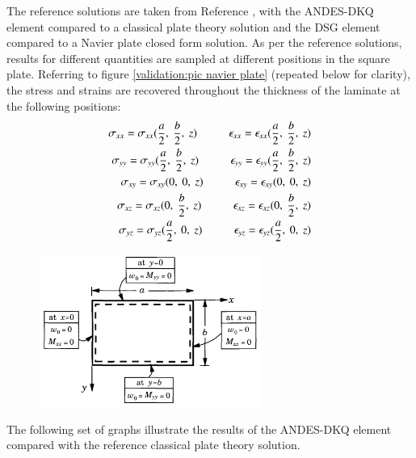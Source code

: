 The reference solutions are taken from Reference \cite{reddy2004mechanics}, with the ANDES-DKQ element compared to a classical plate theory solution and the DSG element compared to a Navier plate closed form solution. As per the reference solutions, results for different quantities are sampled at different positions in the square plate. Referring to figure \ref{validation:pic navier plate} (repeated below for clarity), the stress and strains are recovered throughout the thickness of the laminate at the following positions:
\begin{align*} 
\sigma_{xx} = \sigma_{xx}(\frac{a}{2},\ \frac{b}{2},\ z)
\hspace{10mm}
\epsilon_{xx} = \epsilon_{xx}(\frac{a}{2},\ \frac{b}{2},\ z)
\\
\sigma_{yy} = \sigma_{yy}(\frac{a}{2},\ \frac{b}{2},\ z)
\hspace{10mm}
\epsilon_{yy} = \epsilon_{yy}(\frac{a}{2},\ \frac{b}{2},\ z)
\\
\sigma_{xy} = \sigma_{xy}(0,\ 0,\ z)
\hspace{10mm}
\epsilon_{xy} = \epsilon_{xy}(0,\ 0,\ z)
\\
\sigma_{xz} = \sigma_{xz}(0,\ \frac{b}{2},\ z)
\hspace{10mm}
\epsilon_{xz} = \epsilon_{xz}(0,\ \frac{b}{2},\ z)
\\
\sigma_{yz} = \sigma_{yz}(\frac{a}{2},\ 0,\ z)
\hspace{10mm}
\epsilon_{yz} = \epsilon_{yz}(\frac{a}{2},\ 0,\ z)
\end{align*}
\begin{figure}[H]
	\centering
	\def\svgwidth{\columnwidth}
	\includegraphics[width=7.3cm]{images/navier_plate_def.png}
\end{figure}

The following set of graphs illustrate the results of the ANDES-DKQ element compared with the reference classical plate theory solution.

